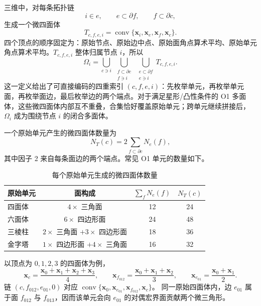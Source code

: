 \documentclass[UTF8,a4paper,11pt,openany]{ctexrep}
\numberwithin{equation}{chapter}
\begin{document}
三维中，对每条拓扑链
\begin{equation}
  i\in e,\qquad e\subset\partial f,\qquad f\subset\partial c,
  \label{eq:topology-chain}
\end{equation}
生成一个微四面体
\begin{equation}
  T_{c,f,e,i}
  =\operatorname{conv}\{\bm x_i,\bm x_e,\bm x_f,\bm x_c\}.
  \label{eq:dual-microtet}
\end{equation}
四个顶点的顺序固定为：原始节点、原始边中点、原始面角点算术平均、原始单元角点算术平均。$T_{c,f,e,i}$ 整体归属节点 $i$，所以
\begin{equation}
  \boxed{
  \Omega_i=
  \bigcup_{c\ni i}
  \ \bigcup_{\substack{f\subset\partial c\\f\ni i}}
  \ \bigcup_{\substack{e\subset\partial f\\e\ni i}}
  T_{c,f,e,i}.}
  \label{eq:dual-cell-union}
\end{equation}
这一定义给出了可直接编码的四重索引 $(c,f,e,i)$：先枚举单元，再枚举单元面，再枚举面边，最后枚举边的两个端点。对于满足星形/凸性条件的 O1 多面体，这些微四面体内部互不重叠，合集恰好覆盖原始单元；跨单元继续拼接后，$\Omega_i$ 成为围绕节点 $i$ 的闭合多面体。

一个原始单元产生的微四面体数量为
\begin{equation}
  N_T(c)=2\sum_{f\subset\partial c}N_e(f),
\end{equation}
其中因子 2 来自每条面边的两个端点。常见 O1 单元的数量如下。

\begin{table}[htbp]
\centering
\caption{每个原始单元生成的微四面体数量}
\label{tab:microtet-count}
\begin{tabular}{lccc}
\toprule
原始单元 & 面构成 & $\sum_fN_e(f)$ & $N_T(c)$\\
\midrule
四面体 & $4\times$ 三角面 & 12 & 24\\
六面体 & $6\times$ 四边形面 & 24 & 48\\
三棱柱 & $2\times$ 三角面 $+3\times$ 四边形面 & 18 & 36\\
金字塔 & $1\times$ 四边形面 $+4\times$ 三角面 & 16 & 32\\
\bottomrule
\end{tabular}
\end{table}

以顶点为 $0,1,2,3$ 的四面体为例，
\begin{equation}
  \bm x_c=\frac{\bm x_0+\bm x_1+\bm x_2+\bm x_3}{4},\qquad
  \bm x_{f_{012}}=\frac{\bm x_0+\bm x_1+\bm x_2}{3},\qquad
  \bm x_{e_{01}}=\frac{\bm x_0+\bm x_1}{2}.
\end{equation}
链 $(c,f_{012},e_{01},0)$ 对应
$\operatorname{conv}\{\bm x_0,\bm x_{e_{01}},\bm x_{f_{012}},\bm x_c\}$。
同一原始四面体内，边 $e_{01}$ 属于面 $f_{012}$ 与 $f_{013}$，因而该单元会向 $e_{01}$ 的对偶宏界面贡献两个微三角形。
\end{document}
